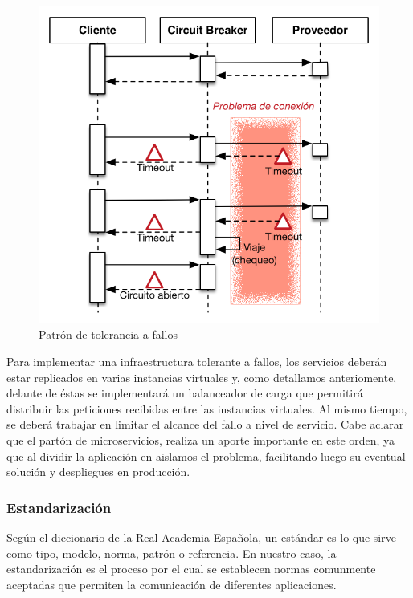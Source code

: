\begin{figure}[H]
  \includegraphics[width=\linewidth,height=0.5\textheight,keepaspectratio]{src/images/04-capitulo-4/circuit-breaker.png}
  \caption{Patrón de tolerancia a fallos }
  \label{fig:circuit_breaker}
\end{figure}

Para implementar una infraestructura tolerante a fallos, los servicios deberán estar replicados en varias instancias virtuales y, como detallamos anteriomente, delante de éstas se implementará un balanceador de carga que permitirá distribuir las peticiones recibidas entre las instancias virtuales.  Al mismo tiempo, se deberá trabajar en limitar el alcance del fallo a nivel de servicio.  Cabe aclarar que el partón de microservicios, realiza un aporte importante en este orden, ya que al dividir la aplicación en  aislamos el problema, facilitando luego su eventual solución y despliegues en producción.

\subsubsection{Estandarización}

Según el diccionario de la Real Academia Española, un estándar es lo que sirve como tipo, modelo, norma, patrón o referencia. En nuestro caso, la estandarización es el proceso por el cual se establecen normas comunmente aceptadas que permiten la comunicación de diferentes aplicaciones.

